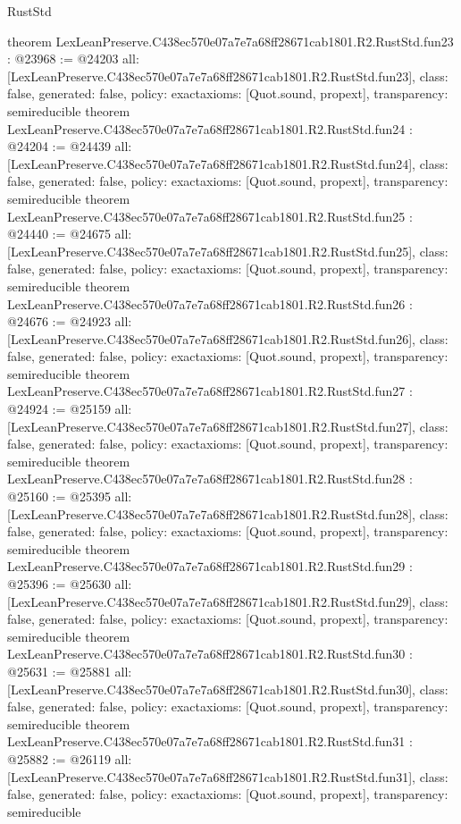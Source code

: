 \begin{lexlean}{RustStd}
\begin{coremodule}
{}
theorem LexLeanPreserve.C438ec570e07a7e7a68ff28671cab1801.R2.RustStd.fun23 : @23968 := @24203 {
  all: [LexLeanPreserve.C438ec570e07a7e7a68ff28671cab1801.R2.RustStd.fun23],
  class: false,
  generated: false,
  policy: exact{axioms: [Quot.sound, propext]},
  transparency: semireducible
}
theorem LexLeanPreserve.C438ec570e07a7e7a68ff28671cab1801.R2.RustStd.fun24 : @24204 := @24439 {
  all: [LexLeanPreserve.C438ec570e07a7e7a68ff28671cab1801.R2.RustStd.fun24],
  class: false,
  generated: false,
  policy: exact{axioms: [Quot.sound, propext]},
  transparency: semireducible
}
theorem LexLeanPreserve.C438ec570e07a7e7a68ff28671cab1801.R2.RustStd.fun25 : @24440 := @24675 {
  all: [LexLeanPreserve.C438ec570e07a7e7a68ff28671cab1801.R2.RustStd.fun25],
  class: false,
  generated: false,
  policy: exact{axioms: [Quot.sound, propext]},
  transparency: semireducible
}
theorem LexLeanPreserve.C438ec570e07a7e7a68ff28671cab1801.R2.RustStd.fun26 : @24676 := @24923 {
  all: [LexLeanPreserve.C438ec570e07a7e7a68ff28671cab1801.R2.RustStd.fun26],
  class: false,
  generated: false,
  policy: exact{axioms: [Quot.sound, propext]},
  transparency: semireducible
}
theorem LexLeanPreserve.C438ec570e07a7e7a68ff28671cab1801.R2.RustStd.fun27 : @24924 := @25159 {
  all: [LexLeanPreserve.C438ec570e07a7e7a68ff28671cab1801.R2.RustStd.fun27],
  class: false,
  generated: false,
  policy: exact{axioms: [Quot.sound, propext]},
  transparency: semireducible
}
theorem LexLeanPreserve.C438ec570e07a7e7a68ff28671cab1801.R2.RustStd.fun28 : @25160 := @25395 {
  all: [LexLeanPreserve.C438ec570e07a7e7a68ff28671cab1801.R2.RustStd.fun28],
  class: false,
  generated: false,
  policy: exact{axioms: [Quot.sound, propext]},
  transparency: semireducible
}
theorem LexLeanPreserve.C438ec570e07a7e7a68ff28671cab1801.R2.RustStd.fun29 : @25396 := @25630 {
  all: [LexLeanPreserve.C438ec570e07a7e7a68ff28671cab1801.R2.RustStd.fun29],
  class: false,
  generated: false,
  policy: exact{axioms: [Quot.sound, propext]},
  transparency: semireducible
}
theorem LexLeanPreserve.C438ec570e07a7e7a68ff28671cab1801.R2.RustStd.fun30 : @25631 := @25881 {
  all: [LexLeanPreserve.C438ec570e07a7e7a68ff28671cab1801.R2.RustStd.fun30],
  class: false,
  generated: false,
  policy: exact{axioms: [Quot.sound, propext]},
  transparency: semireducible
}
theorem LexLeanPreserve.C438ec570e07a7e7a68ff28671cab1801.R2.RustStd.fun31 : @25882 := @26119 {
  all: [LexLeanPreserve.C438ec570e07a7e7a68ff28671cab1801.R2.RustStd.fun31],
  class: false,
  generated: false,
  policy: exact{axioms: [Quot.sound, propext]},
  transparency: semireducible
}
\end{coremodule}
\end{lexlean}
